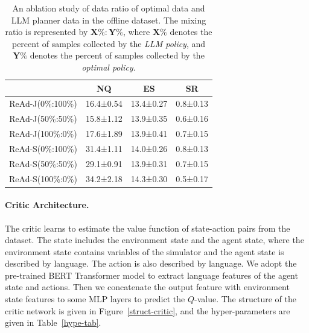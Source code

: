 \documentclass[11pt]{article}
\theoremstyle{plain}
\theoremstyle{remark}
\begin{document}
\begin{table}[h!]
\caption{An ablation study of data ratio of optimal data and LLM planner data in the offline dataset. The mixing ratio is represented by $\mathbf{X}\%:\mathbf{Y}\%$, where $\mathbf{X}\%$ denotes the percent of samples collected by the \emph{LLM policy}, and $\mathbf{Y}\%$ denotes the percent of samples collected by the \emph{optimal policy}.}
\begin{center}
\begin{small}
\begin{sc}
\begin{tabular}{cccc}
\toprule
                  & NQ & ES & SR \\ \midrule
ReAd-J(0\%:100\%) & 16.4±0.54       & 13.4±0.27      & 0.8±0.13         \\
ReAd-J(50\%:50\%) & 15.8±1.12       & 13.9±0.35      & 0.6±0.16          \\
ReAd-J(100\%:0\%) & 17.6±1.89       & 13.9±0.41      & 0.7±0.15          \\ \midrule
ReAd-S(0\%:100\%) & 31.4±1.11       & 14.0±0.26      & 0.8±0.13         \\
ReAd-S(50\%:50\%) & 29.1±0.91       & 13.9±0.31      & 0.7±0.15          \\
ReAd-S(100\%:0\%) & 34.2±2.18       & 14.3±0.30      & 0.5±0.17          \\ \bottomrule %
\end{tabular}
\label{xr2-tab}
\end{sc}
\end{small}
\end{center}
\vspace{-2em}
\end{table}

\paragraph{Critic Architecture.}
The critic learns to estimate the value function of state-action pairs from the dataset. The state includes the environment state and the agent state, where the environment state contains variables of the simulator and the agent state is described by language. The action is also described by language. We adopt the pre-trained BERT Transformer model to extract language features of the agent state and actions. Then we concatenate the output feature with environment state features to some MLP layers to predict the $Q$-value. The structure of the critic network is given in Figure~\ref{struct-critic}, and the hyper-parameters are given in Table~\ref{hype-tab}.
\end{document}
